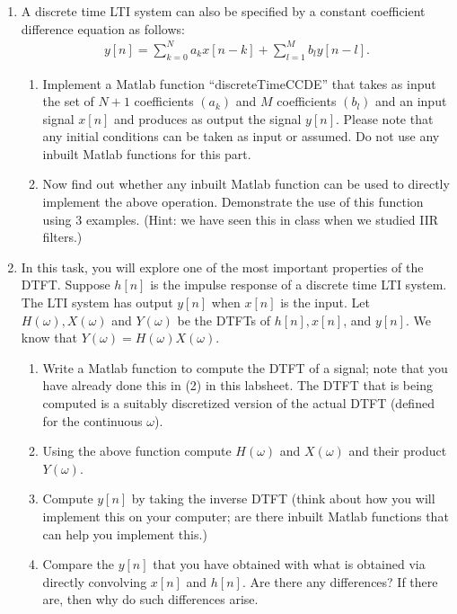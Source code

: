 \begin{enumerate}
\begin{enumerate}
  \end{enumerate}
\item A discrete time LTI system can also be specified by a constant coefficient difference equation as follows:
  \begin{eqnarray*}
    y[n] = \sum_{k = 0}^{N} a_{k} x[n - k] + \sum_{l = 1}^{M} b_{l} y[n - l].
  \end{eqnarray*}
  \begin{enumerate}
  \item Implement a Matlab function ``discreteTimeCCDE'' that takes as input the set of $N+1$ coefficients $(a_{k})$ and $M$ coefficients $(b_{l})$ and an input signal $x[n]$ and produces as output the signal $y[n]$. Please note that any initial conditions can be taken as input or assumed. Do not use any inbuilt Matlab functions for this part.
  \item Now find out whether any inbuilt Matlab function can be used to directly implement the above operation. Demonstrate the use of this function using 3 examples. (Hint: we have seen this in class when we studied IIR filters.)
  \end{enumerate}
\item In this task, you will explore one of the most important properties of the DTFT. Suppose $h[n]$ is the impulse response of a discrete time LTI system. The LTI system has output $y[n]$ when $x[n]$ is the input. Let $H(\omega), X(\omega)$ and $Y(\omega)$ be the DTFTs of $h[n], x[n]$, and $y[n]$. We know that $Y(\omega) = H(\omega) X(\omega)$.
  \begin{enumerate}
  \item Write a Matlab function to compute the DTFT of a signal; note that you have already done this in (2) in this labsheet. The DTFT that is being computed is a suitably discretized version of the actual DTFT (defined for the continuous $\omega$).
  \item Using the above function compute $H(\omega)$ and $X(\omega)$ and their product $Y(\omega)$.
  \item Compute $y[n]$ by taking the inverse DTFT (think about how you will implement this on your computer; are there inbuilt Matlab functions that can help you implement this.)
  \item Compare the $y[n]$ that you have obtained with what is obtained via directly convolving $x[n]$ and $h[n]$. Are there any differences? If there are, then why do such differences arise.
  \end{enumerate}
  

\end{enumerate}
